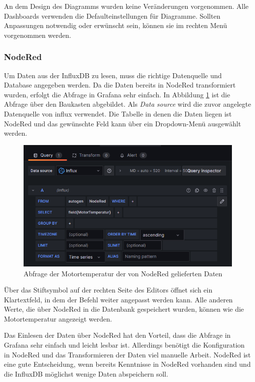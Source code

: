 \documentclass[a4paper, 12pt, oneside, toc=listofnumbered, bibliography=totoc]{scrbook}
\begin{document}
		An dem Design des Diagramms wurden keine Veränderungen vorgenommen. Alle Dashboards verwenden die Defaulteinstellungen für Diagramme. Sollten Anpassungen notwendig oder erwünscht sein, können sie im rechten Menü vorgenommen werden.
		
			\subsubsection{NodeRed}\label{ch:NodeRedGrafana}
			
			Um Daten aus der InfluxDB zu lesen, muss die richtige Datenquelle und Database angegeben werden. Da die Daten bereits in NodeRed transformiert wurden, erfolgt die Abfrage in Grafana sehr einfach. In Abbildung \ref{fig:noderedabfrage} ist die Abfrage über den Baukasten abgebildet. Als \textit{Data source} wird die zuvor angelegte Datenquelle von influx verwendet. Die Tabelle in denen die Daten liegen ist NodeRed und das gewünschte Feld kann über ein Dropdown-Menü ausgewählt werden. 
		
		\begin{figure}[H]
			\centering
			\includegraphics[width=0.9\linewidth]{res/NodeRedAbfrage.png}
			\caption{Abfrage der Motortemperatur der von NodeRed gelieferten Daten}
			\label{fig:noderedabfrage}
		\end{figure}
		
		Über das Stiftsymbol auf der rechten Seite des Editors öffnet sich ein Klartextfeld, in dem der Befehl weiter angepasst werden kann. Alle anderen Werte, die über NodeRed in die Datenbank gespeichert wurden, können wie die Motortemperatur angezeigt werden.
		
		Das Einlesen der Daten über NodeRed hat den Vorteil, dass die Abfrage in Grafana sehr einfach und leicht lesbar ist. Allerdings benötigt die Konfiguration in NodeRed und das Transformieren der Daten viel manuelle Arbeit. NodeRed ist eine gute Entscheidung, wenn bereits Kenntnisse in NodeRed vorhanden sind und die InfluxDB möglichst wenige Daten abspeichern soll. 
		
\end{document}
